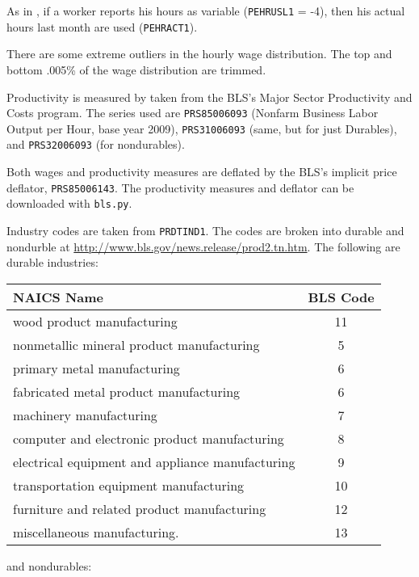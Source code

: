 \documentclass[11pt]{article}
\begin{document}
As in \cite{haefke_sonntag_vanRens_2013}, if a worker reports his hours as variable (\texttt{PEHRUSL1} = -4), then his actual hours last month are used (\texttt{PEHRACT1}).

There are some extreme outliers in the hourly wage distribution.
The top and bottom .005\% of the wage distribution are trimmed.

Productivity is measured by taken from the BLS's Major Sector Productivity and Costs program.
The series used are \texttt{PRS85006093} (Nonfarm Business Labor Output per Hour, base year 2009),
\texttt{PRS31006093} (same, but for just Durables), and \texttt{PRS32006093} (for nondurables).

Both wages and productivity measures are deflated by the BLS's implicit price deflator, \texttt{PRS85006143}.
The productivity measures and deflator can be downloaded with \texttt{bls.py}.

Industry codes are taken from \texttt{PRDTIND1}.
The codes are broken into durable and nondurble at \href{http://www.bls.gov/news.release/prod2.tn.htm}{http://www.bls.gov/news.release/prod2.tn.htm}.
The following are durable industries:

\begin{center}
\begin{tabular}{lc} \toprule
NAICS Name                                      & BLS Code \\ \midrule
wood product manufacturing                      & 11       \\
nonmetallic mineral product manufacturing       & 5        \\
primary metal manufacturing                     & 6        \\
fabricated metal product manufacturing          & 6        \\
machinery manufacturing                         & 7        \\
computer and electronic product manufacturing   & 8        \\
electrical equipment and appliance manufacturing& 9        \\
transportation equipment manufacturing          & 10       \\
furniture and related product manufacturing     & 12       \\
miscellaneous manufacturing.                    & 13       \\
\end{tabular}
\end{center}
and nondurables:
\end{document}
